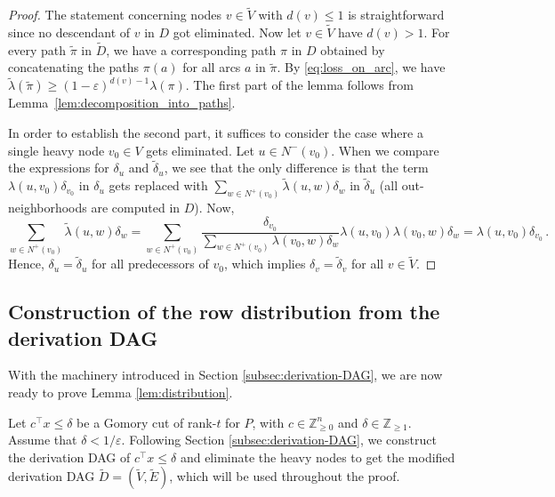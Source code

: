 \documentclass[11pt]{article}
\newcommand{\Z}{\mathbb{Z}}
\newcommand{\eps}{\varepsilon}
\newcommand{\rhs}{\delta}
\theoremstyle{remark}
\begin{document}
\begin{proof}
The statement concerning nodes $v \in \tilde{V}$ with $d(v) \le 1$ is straightforward since no descendant of $v$ in $D$ got eliminated. Now let $v \in \tilde{V}$ have $d(v) > 1$. For every path $\tilde{\pi}$ in $\tilde{D}$, we have a corresponding path $\pi$ in $D$ obtained by concatenating the paths $\pi(a)$ for all arcs $a$ in $\tilde{\pi}$. By \eqref{eq:loss_on_arc}, we have $\tilde{\lambda}(\tilde{\pi}) \ge (1-\eps)^{d(v)-1} \lambda(\pi)$. The first part of the lemma follows from Lemma~\ref{lem:decomposition_into_paths}.

In order to establish the second part, it suffices to consider the case where a single heavy node $v_0 \in V$ gets eliminated. Let $u \in N^-(v_0)$. When we compare the expressions for $\rhs_u$ and $\tilde{\rhs}_u$, we see that the only difference is that the term $\lambda(u,v_0) \rhs_{v_0}$ in $\rhs_u$ gets replaced with $\sum_{w \in N^{+}(v_0)} \tilde{\lambda}(u,w) \rhs_w$ in $\tilde{\rhs}_u$ (all out-neighborhoods are computed in $D$). Now,
$$
\sum_{w \in N^{+}(v_0)} \tilde{\lambda}(u,w) \rhs_w
= 
\sum_{w \in N^{+}(v_0)}  
\frac{\rhs_{v_0}}{\sum_{w \in N^{+}(v_0)} \lambda(v_0,w) \rhs_w}
\lambda(u,v_0) \lambda(v_0,w) \rhs_w
=
\lambda(u,v_0) \rhs_{v_0}\,.
$$
Hence, $\rhs_u = \tilde{\rhs}_u$ for all predecessors of $v_0$, which implies $\rhs_v = \tilde{\rhs}_v$ for all $v \in \tilde{V}$.
\end{proof}

\subsection{Construction of the row distribution from the derivation DAG}

With the machinery introduced in Section \ref{subsec:derivation-DAG}, we are now ready to prove Lemma \ref{lem:distribution}.

    Let $c^\intercal x \le \rhs$ be a Gomory cut of rank-$t$ for $P$, with $c \in \Z^n_{\ge 0}$ and $\rhs \in \Z_{\ge 1}$. Assume that $\rhs < 1/\eps$. Following Section \ref{subsec:derivation-DAG}, we construct the derivation DAG of $c^\intercal x \le \rhs$ and eliminate the heavy nodes to get the modified derivation DAG $\tilde{D}=(\tilde{V}, \tilde{E})$, which will be used throughout the proof.
    
\end{document}
